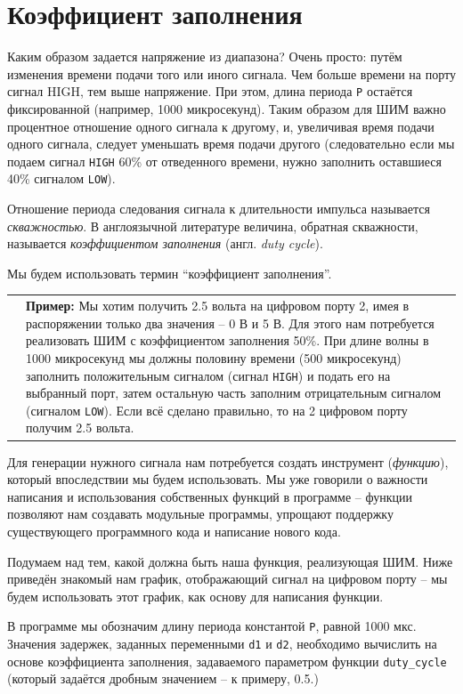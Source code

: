 \documentclass[a4paper,twoside]{book}
\newcommand{\example}[1]{
  \vspace{8pt}
  \begin{tabularx}{\textwidth}{m{1cm} m{9cm}}
    
    & \textbf{Пример:} #1 \\
  \end{tabularx}
}
\begin{document}
\section{Коэффициент заполнения}

Каким образом задается напряжение из диапазона? Очень просто: путём изменения
времени подачи того или иного сигнала. Чем больше времени на порту сигнал HIGH,
тем выше напряжение. При этом, длина периода \texttt{P} остаётся фиксированной
(например, 1000 микросекунд). Таким образом для ШИМ важно процентное отношение
одного сигнала к другому, и, увеличивая время подачи одного сигнала, следует
уменьшать время подачи другого (следовательно если мы подаем сигнал
\texttt{HIGH} 60\% от отведенного времени, нужно заполнить оставшиеся 40\%
сигналом \texttt{LOW}).

Отношение периода следования сигнала к длительности импульса называется
\emph{скважностью}. В англоязычной литературе величина, обратная скважности,
называется \emph{коэффициентом заполнения} (англ. \emph{duty cycle}).

Мы будем использовать термин ``коэффициент заполнения''.

\example {
  Мы хотим получить 2.5 вольта на цифровом порту 2, имея в
  распоряжении только два значения -- 0 В и 5 В. Для этого нам потребуется
  реализовать ШИМ с коэффициентом заполнения 50\%. При длине волны в 1000
  микросекунд мы должны половину времени (500 микросекунд) заполнить
  положительным сигналом (сигнал \texttt{HIGH}) и подать его на выбранный порт, затем
  остальную часть заполним отрицательным сигналом (сигналом \texttt{LOW}).
  Если всё сделано правильно, то на 2 цифровом порту получим 2.5 вольта.
}

Для генерации нужного сигнала нам потребуется создать инструмент
(\emph{функцию}), который впоследствии мы будем использовать. Мы уже говорили о
важности написания и использования собственных функций в программе -- функции
позволяют нам создавать модульные программы, упрощают поддержку существующего
программного кода и написание нового кода.

Подумаем над тем, какой должна быть наша функция, реализующая ШИМ. Ниже приведён
знакомый нам график, отображающий сигнал на цифровом порту -- мы будем
использовать этот график, как основу для написания функции.


В программе мы обозначим длину периода константой \texttt{P}, равной 1000 мкс.
Значения задержек, заданных переменными \texttt{d1} и \texttt{d2}, необходимо
вычислить на основе коэффициента заполнения, задаваемого параметром функции
\texttt{duty\_cycle} (который задаётся дробным значением -- к примеру, 0.5.)
\end{document}
